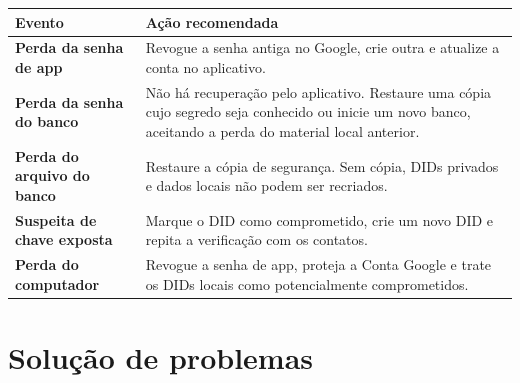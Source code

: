 \documentclass[11pt,a4paper]{article}
\begin{document}
\begin{tabularx}{\textwidth}{>{\bfseries}p{}X}
  \toprule
  Evento & Ação recomendada \\
  \midrule
  Perda da senha de app & Revogue a senha antiga no Google, crie outra e atualize a conta no aplicativo. \\
  Perda da senha do banco & Não há recuperação pelo aplicativo. Restaure uma cópia cujo segredo seja conhecido ou inicie um novo banco, aceitando a perda do material local anterior. \\
  Perda do arquivo do banco & Restaure a cópia de segurança. Sem cópia, DIDs privados e dados locais não podem ser recriados. \\
  Suspeita de chave exposta & Marque o DID como comprometido, crie um novo DID e repita a verificação com os contatos. \\
  Perda do computador & Revogue a senha de app, proteja a Conta Google e trate os DIDs locais como potencialmente comprometidos. \\
  \bottomrule
\end{tabularx}

\section{Solução de problemas}
\end{document}

